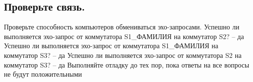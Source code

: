 
\subsection{Проверьте связь.}
Проверьте способность компьютеров обмениваться эхо-запросами.
Успешно ли выполняется эхо-запрос от коммутатора S1\_ФАМИЛИЯ на
коммутатор S2? -- да
Успешно ли выполняется эхо-запрос от коммутатора
S1\_ФАМИЛИЯ на коммутатор S3? -- да
Успешно ли выполняется эхо-запрос от
коммутатора S2 на коммутатор S3? -- да
Выполняйте отладку до тех пор, пока ответы на все вопросы не будут положительными

